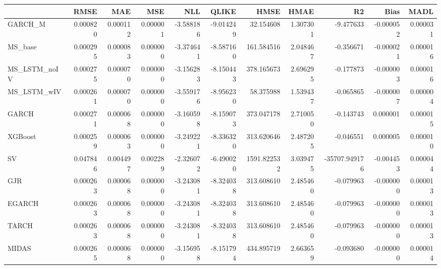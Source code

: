 \begin{tabular}{lrrrrrrrrrr}
\toprule
 & RMSE & MAE & MSE & NLL & QLIKE & HMSE & HMAE & R2 & Bias & MADL \\
\midrule
GARCH_M & 0.000820 & 0.000112 & 0.000001 & -3.588186 & -9.014249 & 32.154608 & 1.307301 & -9.477633 & -0.000052 & 0.000031 \\
MS_base & 0.000295 & 0.000083 & 0.000000 & -3.374641 & -8.587160 & 161.584516 & 2.048467 & -0.356671 & -0.000021 & 0.000016 \\
MS_LSTM_noIV & 0.000275 & 0.000070 & 0.000000 & -3.156283 & -8.150443 & 378.165673 & 2.696295 & -0.177873 & -0.000003 & 0.000016 \\
MS_LSTM_wIV & 0.000261 & 0.000070 & 0.000000 & -3.559176 & -8.956230 & 58.375988 & 1.539437 & -0.065865 & -0.000007 & 0.000004 \\
GARCH & 0.000271 & 0.000068 & 0.000000 & -3.160598 & -8.159073 & 373.047178 & 2.710050 & -0.143743 & 0.000001 & 0.000015 \\
XGBoost & 0.000259 & 0.000063 & 0.000000 & -3.249221 & -8.336320 & 313.620646 & 2.487205 & -0.046551 & 0.000005 & 0.000010 \\
SV & 0.047846 & 0.004497 & 0.002289 & -2.326072 & -6.490020 & 1591.822532 & 3.039475 & -35707.949176 & -0.004453 & 0.000044 \\
GJR & 0.000263 & 0.000068 & 0.000000 & -3.243081 & -8.324038 & 313.608610 & 2.485460 & -0.079963 & -0.000000 & 0.000013 \\
EGARCH & 0.000263 & 0.000068 & 0.000000 & -3.243081 & -8.324038 & 313.608610 & 2.485460 & -0.079963 & -0.000000 & 0.000013 \\
TARCH & 0.000263 & 0.000068 & 0.000000 & -3.243081 & -8.324038 & 313.608610 & 2.485460 & -0.079963 & -0.000000 & 0.000013 \\
MIDAS & 0.000265 & 0.000068 & 0.000000 & -3.156958 & -8.151794 & 434.895719 & 2.663659 & -0.093680 & -0.000000 & 0.000014 \\
\bottomrule
\end{tabular}
